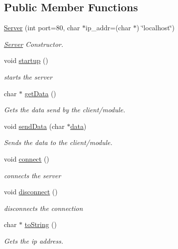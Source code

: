 \subsection*{Public Member Functions}
\begin{DoxyCompactItemize}
\item 
\hyperlink{classServer_a693b9b86cd9538ff4833a550515cabf8}{Server} (int port=80, char $\ast$ip\+\_\+addr=(char $\ast$) \char`\"{}localhost\char`\"{})
\begin{DoxyCompactList}\small\item\em \hyperlink{classServer}{Server} Constructor. \end{DoxyCompactList}\item 
void \hyperlink{classServer_aaa7517710dd809ba4d965eb83801fd05}{startup} ()
\begin{DoxyCompactList}\small\item\em starts the server \end{DoxyCompactList}\item 
char $\ast$ \hyperlink{classServer_a6b6c39b02aeae611dcb2a9f2f5a8d801}{get\+Data} ()
\begin{DoxyCompactList}\small\item\em Gets the data send by the client/module. \end{DoxyCompactList}\item 
void \hyperlink{classServer_a5061ce779b01e1c5cf8146022db8b08d}{send\+Data} (char $\ast$\hyperlink{classServer_a511bae2c5604c196eb714c798fdf709d}{data})
\begin{DoxyCompactList}\small\item\em Sends the data to the client/module. \end{DoxyCompactList}\item 
void \hyperlink{classServer_a0bd7069e79b4d5268f0947079e1af54a}{connect} ()
\begin{DoxyCompactList}\small\item\em connects the server \end{DoxyCompactList}\item 
void \hyperlink{classServer_acd0114484495cfd2749816ddb12e4246}{disconnect} ()
\begin{DoxyCompactList}\small\item\em disconnects the connection \end{DoxyCompactList}\item 
char $\ast$ \hyperlink{classServer_aee9a13517df765d3c085fab605f24be4}{to\+String} ()
\begin{DoxyCompactList}\small\item\em Gets the ip address. \end{DoxyCompactList}\end{DoxyCompactItemize}
